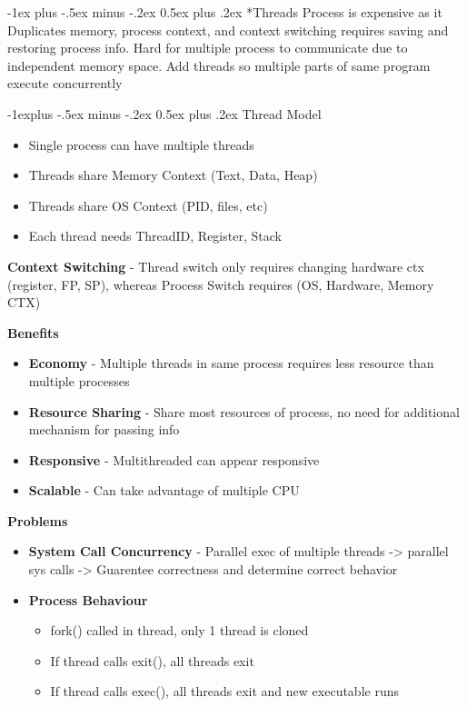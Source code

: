 \documentclass[10pt,landscape]{article}
\makeatletter
\renewcommand{\section}{\@startsection{section}{1}{0mm}%
  {-1ex plus -.5ex minus -.2ex}%
  {0.5ex plus .2ex}%
{\normalfont\large\bfseries}}
\renewcommand{\subsection}{\@startsection{subsection}{2}{0mm}%
  {-1explus -.5ex minus -.2ex}%
  {0.5ex plus .2ex}%
{\normalfont\normalsize\bfseries}}
\makeatother
\begin{document}
\begin{multicols*}{4}
  \section*{Threads}
Process is expensive as it Duplicates memory, process context, and context switching requires saving and restoring process info. Hard for multiple process to communicate due to independent memory space. Add threads so multiple parts of same program execute concurrently

\subsection{Thread Model}
\begin{itemize}
  \item Single process can have multiple threads
  \item Threads share Memory Context (Text, Data, Heap)
  \item Threads share OS Context (PID, files, etc)
  \item Each thread needs ThreadID, Register, Stack
\end{itemize}

\textbf{Context Switching} - 
Thread switch only requires changing hardware ctx (register, FP, SP), whereas Process Switch requires (OS, Hardware, Memory CTX)

\textbf{Benefits}
\begin{itemize}
  \item \textbf{Economy} - Multiple threads in same process requires less resource than multiple processes
  \item \textbf{Resource Sharing} - Share most resources of process, no need for additional mechanism for passing info
  \item \textbf{Responsive} - Multithreaded can appear responsive
  \item \textbf{Scalable} - Can take advantage of multiple CPU
\end{itemize}

\textbf{Problems}
\begin{itemize}
  \item \textbf{System Call Concurrency} - Parallel exec of multiple threads -> parallel sys calls -> Guarentee correctness and determine correct behavior
  \item \textbf{Process Behaviour}
    \begin{itemize}
      \item fork() called in thread, only 1 thread is cloned
      \item If thread calls exit(), all threads exit
      \item If thread calls exec(), all threads exit and new executable runs
    \end{itemize}
\end{itemize}


\end{multicols*}
\end{document}

